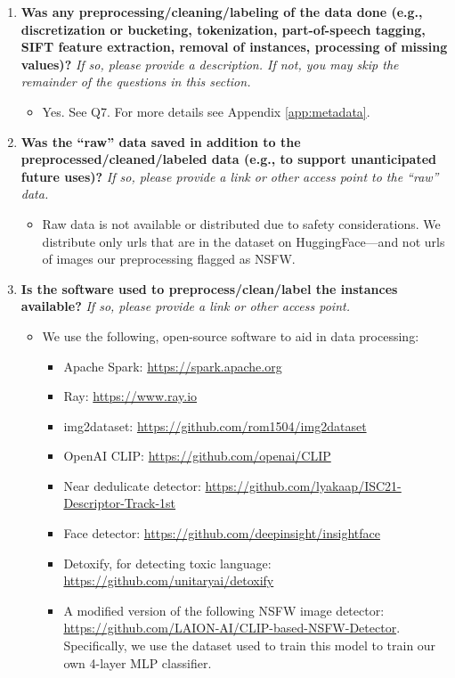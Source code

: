 \begin{enumerate}[label=Q\arabic*]
\item \textbf{Was any preprocessing/cleaning/labeling of the data done (e.g., discretization or bucketing, tokenization, part-of-speech tagging, SIFT feature extraction, removal of instances, processing of missing values)?} \textit{If so, please provide a description. If not, you may skip the remainder of the questions in this section.}

\begin{itemize}
\item Yes. See Q7.
For more details see Appendix \ref{app:metadata}.
\end{itemize}

\item \textbf{Was the “raw” data saved in addition to the preprocessed/cleaned/labeled data (e.g., to support unanticipated future uses)?} \textit{If so, please provide a link or other access point to the “raw” data.}

\begin{itemize}
\item Raw data is not available or distributed due to safety considerations. We distribute only urls that are in the dataset on HuggingFace---and not urls of images our preprocessing flagged as NSFW.
\end{itemize}

\item \textbf{Is the software used to preprocess/clean/label the instances available?} \textit{If so, please provide a link or other access point.}

\begin{itemize}
\item We use the following, open-source software to aid in data processing:
\begin{itemize}
\item Apache Spark: \url{https://spark.apache.org}
\item Ray: \url{https://www.ray.io}
\item img2dataset: \url{https://github.com/rom1504/img2dataset}
\item OpenAI CLIP: \url{https://github.com/openai/CLIP}
\item Near dedulicate detector: \url{https://github.com/lyakaap/ISC21-Descriptor-Track-1st}
\item Face detector: \url{https://github.com/deepinsight/insightface}
\item Detoxify, for detecting toxic language: \url{https://github.com/unitaryai/detoxify}
\item A modified version of the following NSFW image detector: 
\url{https://github.com/LAION-AI/CLIP-based-NSFW-Detector}. Specifically, we use the dataset used to train this model to train our own 4-layer MLP classifier.
\end{itemize}
\end{itemize}


\end{enumerate}
